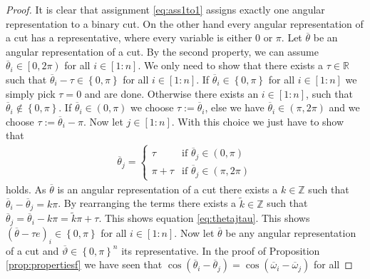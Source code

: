 \documentclass[12pt,a4paper]{article}
\theoremstyle{mythm}
\begin{document}
\begin{proof}
It is clear that assignment \ref{eq:ass1to1} assigns exactly one angular representation to a binary cut.
On the other hand every angular representation of a cut has a representative, where every variable is either $ 0 $ or $ \pi $.
Let $ \overline{ \theta}   $ be an angular representation of a cut. 
By the second property, we can assume $ \overline{ \theta}_i  \in \left[ 0, 2 \pi \right)  $ for all $ i \in \left[ 1:n \right]  $.
We only need to show that there exists a $ \tau \in \mathbb{R} $ such that $ \overline{ \theta }_i - \tau \in \left\{ 0, \pi  \right\}	$ for all $ i \in \left[ 1:n \right] $.
If $ \overline{ \theta } _{ i } \in \left\{ 0, \pi  \right\}  $ for all $ i \in \left[ 1:n \right]  $ we simply pick $ \tau = 0 $ and are done.
Otherwise there exists an $ i \in \left[ 1:n \right]  $, such that $ \overline{ \theta  }_i \notin \left\{ 0, \pi  \right\}  $. 
If $ \overline{ \theta }_i \in \left( 0 , \pi  \right)  $ we choose $ \tau := \overline{ \theta }_i  $, else we have $ \overline{ \theta } _{ i } \in \left( \pi , 2 \pi
\right)  $ and we choose $ \tau := \overline{ \theta } _{ i } - \pi $.
Now let $ j \in \left[ 1:n \right]  $. 
With this choice we just have to show that 
\begin{align}
\label{eq:thetajtau} 
 \overline{ \theta } _{ j } = \begin{cases}
 \tau  & \text{if } \overline{ \theta } _{ j } \in \left( 0, \pi \right) \\
 \pi + \tau  & \text{if } \overline{ \theta } _{ j } \in \left( \pi, 2 \pi \right) 
 \end{cases}
\end{align} 
holds.
As $ \overline{ \theta }  $ is an angular representation of a cut there exists a $ k \in \mathbb{Z} $ such that 
$ \overline{ \theta } _{ i } - \overline{ \theta } _{ j } = k \pi   $. By rearranging the terms there exists a $ \widetilde{ k } \in \mathbb{Z} $ such that  
$ \overline{ \theta } _{ j } = \overline{ \theta } _{ i } - k \pi = \widetilde{ k } \pi + \tau $.
This shows equation \ref{eq:thetajtau}. 
This shows $ \left( \overline{ \theta } - \tau e  \right) _{ i } \in \left\{ 0, \pi  \right\}  $ for all $ i \in \left[ 1:n \right]  $.
Now let $ \overline{ \theta }  $ be any angular representation of a cut and $ \overline{ \vartheta } \in \left\{ 0, \pi  \right\} ^{ n }   $ its representative.
In the proof of Proposition \ref{prop:propertiesf} we have seen that $ \cos( \overline{ \theta} _{ i } - \overline{ \theta }  _{ j }    )  = \cos( \overline{ \omega } _{ i } -
\overline{ \omega } _{ j }  ) $ for all 
\end{proof}
\end{document}
